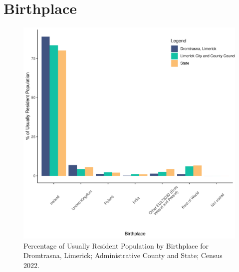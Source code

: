 \documentclass{article}
\begin{document}
\section{Birthplace}\label{sect:Birth}
\begin{figure}[H]
	\centering
	\includegraphics[width = 130mm]{../figures/BirthED.pdf}
	\caption{Percentage of Usually Resident Population by Birthplace for Dromtrasna, Limerick; Administrative County and State; Census 2022.}
	\label{fig:vbnv}
	\end{figure}
	
\end{document}
